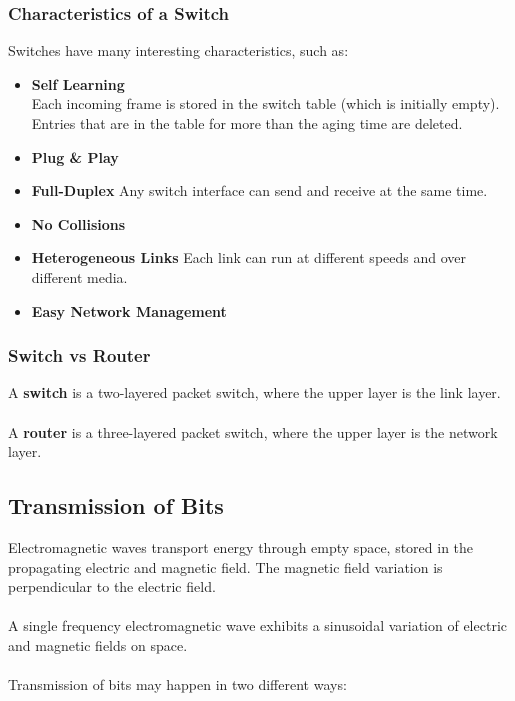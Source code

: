\documentclass{article}
\begin{document}
\subsubsection{Characteristics of a Switch}
Switches have many interesting characteristics, such as:

\begin{itemize}
	\item \textbf{Self Learning}
	\vspace{.2cm} \\
	Each incoming frame is stored in the switch table (which is initially empty). Entries that are in the table for more than the aging time are deleted.
	
	\item \textbf{Plug \& Play}
	
	\item \textbf{Full-Duplex}
	Any switch interface can send and receive at the same time.
	
	\item \textbf{No Collisions}
	
	\item \textbf{Heterogeneous Links}
	\vspace{.2cm}
	Each link can run at different speeds and over different media.
	
	\item \textbf{Easy Network Management}
\end{itemize}

\subsubsection{Switch vs Router}
A \textbf{switch} is a two-layered packet switch, where the upper layer is the link layer. \\ \\
A \textbf{router} is a three-layered packet switch, where the upper layer is the network layer.

\subsection{Transmission of Bits}
Electromagnetic waves transport energy through empty space, stored in the propagating electric and magnetic field. The magnetic field variation is perpendicular to the electric field. \\ \\
A single frequency electromagnetic wave exhibits a sinusoidal variation of electric and magnetic fields on space. \\ \\
Transmission of bits may happen in two different ways:
\end{document}
